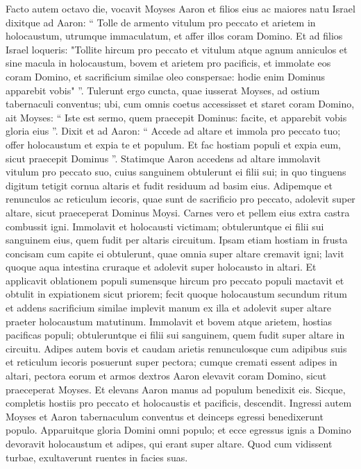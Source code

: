 \begin{biblechapter}
\begin{biblechapter}
\begin{biblechapter}
\begin{biblechapter}
\begin{biblechapter}
\begin{biblechapter}
\begin{biblechapter}
\begin{biblechapter}
\begin{biblechapter}
\verse Facto autem octavo die, vocavit Moyses Aaron et filios eius ac maiores natu Israel dixitque ad Aaron: 
\verse “ Tolle de armento vitulum pro peccato et arietem in holocaustum, utrumque immaculatum, et affer illos coram Domino. 
\verse Et ad filios Israel loqueris: "Tollite hircum pro peccato et vitulum atque agnum anniculos et sine macula in holocaustum, 
\verse bovem et arietem pro pacificis, et immolate eos coram Domino, et sacrificium similae oleo conspersae: hodie enim Dominus apparebit vobis" ”.
 \verse Tulerunt ergo cuncta, quae iusserat Moyses, ad ostium tabernaculi conventus; ubi, cum omnis coetus accessisset et staret coram Domino, 
\verse ait Moyses: “ Iste est sermo, quem praecepit Dominus: facite, et apparebit vobis gloria eius ”. 
\verse Dixit et ad Aaron: “ Accede ad altare et immola pro peccato tuo; offer holocaustum et expia te et populum. Et fac hostiam populi et expia eum, sicut praecepit Dominus ”.
 \verse Statimque Aaron accedens ad altare immolavit vitulum pro peccato suo, 
\verse cuius sanguinem obtulerunt ei filii sui; in quo tinguens digitum tetigit cornua altaris et fudit residuum ad basim eius. 
\verse Adipemque et renunculos ac reticulum iecoris, quae sunt de sacrificio pro peccato, adolevit super altare, sicut praeceperat Dominus Moysi. 
\verse Carnes vero et pellem eius extra castra combussit igni.
 \verse Immolavit et holocausti victimam; obtuleruntque ei filii sui sanguinem eius, quem fudit per altaris circuitum. 
\verse Ipsam etiam hostiam in frusta concisam cum capite ei obtulerunt, quae omnia super altare cremavit igni; 
\verse lavit quoque aqua intestina cruraque et adolevit super holocausto in altari.
 \verse Et applicavit oblationem populi sumensque hircum pro peccato populi mactavit et obtulit in expiationem sicut priorem; 
\verse fecit quoque holocaustum secundum ritum 
\verse et addens sacrificium similae implevit manum ex illa et adolevit super altare praeter holocaustum matutinum.
 \verse Immolavit et bovem atque arietem, hostias pacificas populi; obtuleruntque ei filii sui sanguinem, quem fudit super altare in circuitu. 
\verse Adipes autem bovis et caudam arietis renunculosque cum adipibus suis et reticulum iecoris 
 \verse posuerunt super pectora; cumque cremati essent adipes in altari, 
\verse pectora eorum et armos dextros Aaron elevavit coram Domino, sicut praeceperat Moyses.
 \verse Et elevans Aaron manus ad populum benedixit eis. Sicque, completis hostiis pro peccato et holocaustis et pacificis, descendit. 
\verse Ingressi autem Moyses et Aaron tabernaculum conventus et deinceps egressi benedixerunt populo. Apparuitque gloria Domini omni populo; 
\verse et ecce egressus ignis a Domino devoravit holocaustum et adipes, qui erant super altare. Quod cum vidissent turbae, exultaverunt ruentes in facies suas.
 

\end{biblechapter}
\end{biblechapter}
\end{biblechapter}
\end{biblechapter}
\end{biblechapter}
\end{biblechapter}
\end{biblechapter}
\end{biblechapter}
\end{biblechapter}

